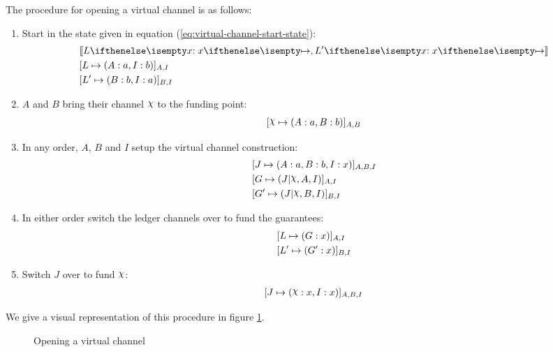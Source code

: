 The procedure for opening a virtual channel is as follows:
\begin{enumerate}
  \item Start in the state given in equation (\ref{eq:virtual-channel-start-state}):
  \begin{align}
    & \adj{\holds{L}{x}{}, \holds{L'}{x}{}}\\
    & \finalizable{L}{\alloc{A:a, I:b}}{A, I} \\
    & \finalizable{L'}{\alloc{B: b, I: a}}{B, I}
  \end{align}
  \item $A$ and $B$ bring their channel $\rchi$ to the funding point:
  \begin{align}
    \finalizable{\rchi}{\alloc{A:a, B:b}}{A,B}
  \end{align}
  \item In any order, $A$, $B$ and $I$ setup the virtual channel construction:
  \begin{align}
    & \finalizable{J}{\alloc{A:a, B:b, I: x}}{A, B, I} \\
    & \finalizable{G}{\guar{J}{\rchi, A, I}}{A, I} \\
    & \finalizable{G'}{\guar{J}{\rchi, B, I}}{B, I}
  \end{align}
  \item In either order switch the ledger channels over to fund the guarantees:
  \begin{align}
    & [L \mapsto ( G: x )]_{A,I} \\
    & [L' \mapsto ( G': x )]_{B,I}
  \end{align}
  \item Switch $J$ over to fund $\rchi$:
  \begin{align}
    \finalizable{J}{\alloc{\rchi: x, I: x}}{A, B, I}
  \end{align}
\end{enumerate}
We give a visual representation of this procedure in figure \ref{fig:virtual-channel-opening}.

\begin{figure}[ht]
  \centering
  
  \caption{Opening a virtual channel}
  \label{fig:virtual-channel-opening}
\end{figure}

